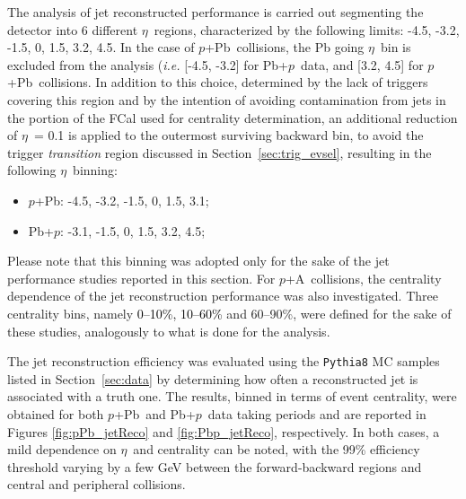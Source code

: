 \documentclass[NOTE, atlasdraft=true, texlive=2020, UKenglish]{atlasdoc}
\newcommand{\ETA}{$\eta$}
\newcommand{\pxA}{$p$+A}
\newcommand{\pxPb}{$p$+Pb}
\newcommand{\Pbxp}{Pb+$p$}
\begin{document}
The analysis of jet reconstructed performance is carried out segmenting the detector into 6 different \ETA\ regions, characterized by the following limits: -4.5, -3.2, -1.5, 0, 1.5, 3.2, 4.5. In the case of \pxPb\ collisions, the Pb going \ETA\ bin is excluded from the analysis (\textit{i.e.} [-4.5, -3.2] for \Pbxp\ data, and [3.2, 4.5] for \pxPb\ collisions. In addition to this choice, determined by the lack of triggers covering this region and by the intention of avoiding contamination from jets in the portion of the FCal used for centrality determination, an additional reduction of \ETA\ = 0.1 is applied to the outermost surviving backward bin, to avoid the trigger \textit{transition} region discussed in Section~\ref{sec:trig_evsel}, resulting in the following \ETA\ binning: 
\begin{itemize}
    \item \pxPb : -4.5, -3.2, -1.5, 0, 1.5, 3.1;
    \item \Pbxp : -3.1, -1.5, 0, 1.5, 3.2, 4.5;
\end{itemize}
Please note that this binning was adopted only for the sake of the jet performance studies reported in this section. For \pxA\ collisions, the centrality dependence of the jet reconstruction performance was also investigated. Three centrality bins, namely \textcolor{black}{
0--10\%, 10--60\% 
}
and 60--90\%, were defined for the sake of these studies, analogously to what is done for the analysis.

The jet reconstruction efficiency was evaluated using the \texttt{Pythia8} MC samples listed in Section~\ref{sec:data} by determining how often a reconstructed jet is associated with a truth one. 
The results, binned in terms of event centrality, were obtained for both \pxPb\ and \Pbxp\ data taking periods and are reported in Figures \ref{fig:pPb_jetReco} and \ref{fig:Pbp_jetReco}, respectively. In both cases, a mild dependence on \ETA\ and centrality can be noted, with the 99\% efficiency threshold varying by a few GeV between the forward-backward regions and central and peripheral collisions. 
\end{document}
